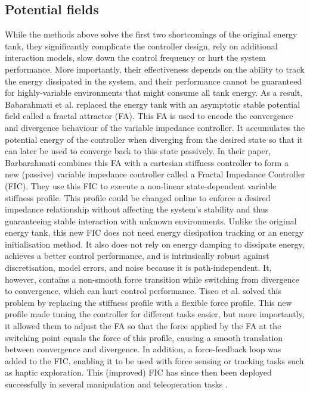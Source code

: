 \subsection{Potential fields}

While the methods above solve the first two shortcomings of the original energy tank, they significantly complicate the controller design, rely on additional interaction models, slow down the control frequency or hurt the system performance. More importantly, their effectiveness depends on the ability to track the energy dissipated in the system, and their performance cannot be guaranteed for highly-variable environments that might consume all tank energy. As a result, Babarahmati et al. \cite{babarahmatiFractalImpedancePassive2021} replaced the energy tank with an asymptotic stable potential field called a fractal attractor (FA). This FA is used to encode the convergence and divergence behaviour of the variable impedance controller. It accumulates the potential energy of the controller when diverging from the desired state so that it can later be used to converge back to this state passively. In their paper, Barbarahmati combines this FA with a cartesian stiffness controller to form a new (passive) variable impedance controller called a Fractal Impedance Controller (FIC). They use this FIC to execute a non-linear state-dependent variable stiffness profile. This profile could be changed online to enforce a desired impedance relationship without affecting the system's stability and thus guaranteeing stable interaction with unknown environments. Unlike the original energy tank, this new FIC does not need energy dissipation tracking or an energy initialisation method. It also does not rely on energy damping to dissipate energy, achieves a better control performance, and is intrinsically robust against discretisation, model errors, and noise because it is path-independent. It, however, contains a non-smooth force transition while switching from divergence to convergence, which can hurt control performance. Tiseo et al. solved this problem by replacing the stiffness profile with a flexible force profile. This new profile made tuning the controller for different tasks easier, but more importantly, it allowed them to adjust the FA so that the force applied by the FA at the switching point equals the force of this profile, causing a smooth translation between convergence and divergence. In addition, a force-feedback loop was added to the FIC, enabling it to be used with force sensing or tracking tasks such as haptic exploration. This (improved) FIC has since then been deployed successfully in several manipulation and teleoperation tasks \cite{tiseoRobustImpedanceControl2022,tiseoFineManipulationDynamic2022,tiseoAchievingDexterousBidirectional2022,tiseoGeometricalPosturalOptimisation2022,babarahmatiRobustHighTransparencyHaptic2021,tiseoSafeCompliantControl2020}.

